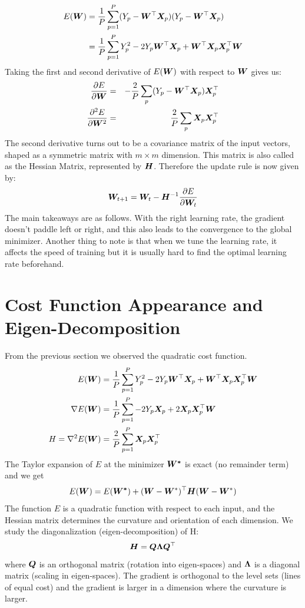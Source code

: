 \begin{align*}
E(\vect{W}) &=\frac{1}{P}\sum_{p=1}^P(Y_{p} - \vect{W}^{\top}\vect{X}_{p})(Y_{p} - \vect{W}^{\top}\vect{X}_{p})\\
&= \frac{1}{P}\sum_{p=1}^P Y_{p}^2 - 2Y_{p}\vect{W}^{\top}\vect{X}_{p} + \vect{W}^{\top}\vect{X}_{p} \vect{X}_p^{\top}\vect{W}
\end{align*}
Taking the first and second derivative of $E(\vect{W})$ with respect to $\vect{W}$ gives us:
\begin{eqnarray*}
\frac{\partial E}{\partial \vect{W}} &=& -\frac{2}{P}\sum_{p}(Y_{p} - \vect{W}^{\top}\vect{X}_{p}) \vect{X}_{p}^\top\\
\frac{\partial^2 E}{\partial \vect{W}^2} &=&  \frac{2}{P}\sum_{p}\vect{X}_{p}\vect{X}_{p}^\top
\end{eqnarray*}
The second derivative turns out to be a covariance matrix of the input vectors, shaped as a symmetric matrix with $m \times m$ dimension. This matrix is also called as the Hessian Matrix, represented by $\matr{H}$. Therefore the update rule is now given by:
$$ \vect{W}_{t+1} = \vect{W}_t - \matr{H}^{-1}\frac{\partial E}{\partial \vect{W}_t} $$
The main takeaways are as follows. With the right learning rate, the gradient doesn't paddle left or right, and this also leads to the convergence to the global minimizer. Another thing to note is that when we tune the learning rate, it affects the speed of training but it is usually hard to find the optimal learning rate beforehand.

\section{Cost Function Appearance and Eigen-Decomposition}
From the previous section we observed the quadratic cost function.
\begin{align*}
E(\vect{W}) &= \frac{1}{P}\sum_{p=1}^P Y_{p}^2 - 2Y_{p}\vect{W}^{\top}\vect{X}_{p} + \vect{W}^{\top}\vect{X}_{p} \vect{X}_p^{\top}\vect{W}\\
\nabla E(\vect{W}) &= \frac{1}{P}\sum_{p=1}^P - 2Y_{p}\vect{X}_{p} + 2\vect{X}_{p} \vect{X}_p^{\top}\vect{W}\\
H = \nabla^2 E(\vect{W}) &= \frac{2}{P}\sum_{p=1}^P \vect{X}_{p} \vect{X}_p^{\top}
\end{align*}
The Taylor expansion of $E$ at the minimizer $\vect{W^*}$ is exact (no remainder term) and we get
$$E(\vect{W})  = E(\vect{W^*}) + (\vect{W}-\vect{W}^*)^{\top}\matr{H}(\vect{W}-\vect{W}^*)$$
The function $E$ is a quadratic function with respect to each input, and the Hessian matrix determines the curvature and orientation of each dimension. We study the diagonalization (eigen-decomposition) of H:
$$ \matr{H} = \matr{Q}\matr{\Lambda}\matr{Q}^\top$$
where $\matr{Q}$ is an orthogonal matrix (rotation into eigen-spaces) and $\matr{\Lambda}$ is a diagonal matrix (scaling in eigen-spaces). The gradient is orthogonal to the level sets (lines of equal cost) and the gradient is larger in a dimension where the curvature is larger. 

